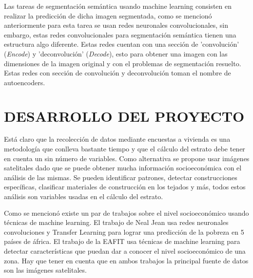 
Las tareas de segmentación semántica usando machine learning consisten en realizar la predicción de dicha imagen segmentada, como se mencionó anteriormente para esta tarea se usan redes neuronales convolucionales, sin embargo, estas redes convolucionales para segmentación semántica tienen una estructura algo diferente. Estas redes cuentan con una sección de 'convolución' (\textit{Encode}) y 'deconvolución' (\textit{Decode}), esto para obtener una imagen con las dimensiones de la imagen original y con el problemas de segmentación resuelto. Estas redes con sección de convolución y deconvolución toman el nombre de autoencoders. 


 
\newpage\chapter{DESARROLLO DEL PROYECTO} 

Está claro que la recolección de datos mediante encuestas a vivienda es una metodología que conlleva bastante tiempo y que el cálculo del estrato debe tener en cuenta un sin número de variables. Como alternativa se propone usar imágenes satelitales dado que se puede obtener mucha información socioeconómica con el análisis de las mismas. Se pueden identificar patrones, detectar construcciones específicas, clasificar materiales de construcción en los tejados y más, todos estos análisis son variables usadas en el cálculo del estrato.
  
Como se mencionó existe un par de trabajos sobre el nivel socioeconómico usando técnicas de machine learning. El trabajo de Neal Jean usa redes neuronales convoluciones y Transfer Learning para lograr una predicción de la pobreza en 5 países de áfrica. El trabajo de la EAFIT usa técnicas de machine learning para detectar características que puedan dar a conocer el nivel socioeconómico de una zona. Hay que tener en cuenta que en ambos trabajos la principal fuente de datos son las imágenes satelitales.
 
